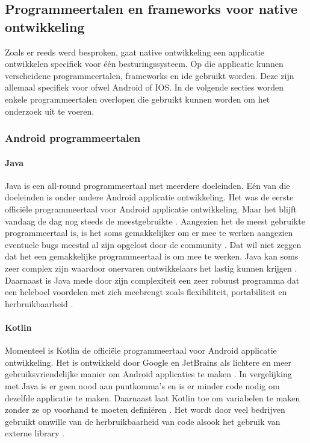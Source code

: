 \subsection{Programmeertalen en frameworks voor native ontwikkeling}
Zoals er reeds werd besproken, gaat native ontwikkeling een applicatie ontwikkelen 
specifiek voor één besturingssysteem. Op die 
applicatie kunnen verscheidene programmeertalen, frameworks 
en \acrshort{ide} gebruikt worden. Deze zijn allemaal specifiek voor ofwel Android of IOS. In de volgende 
secties worden enkele programmeertalen overlopen die gebruikt kunnen worden om het onderzoek uit te voeren.

\subsubsection{Android programmeertalen}
\paragraph{Java}
Java is een all-round programmeertaal met meerdere doeleinden. Eén van die doeleinden 
is onder andere Android applicatie ontwikkeling. Het was de eerste officiële programmeertaal 
voor Android applicatie ontwikkeling. Maar het blijft vandaag de dag nog steeds de 
meestgebruikte \autocite{harkiran2022}. Aangezien het de meest gebruikte programmeertaal 
is, is het soms gemakkelijker om er mee te werken aangezien eventuele bugs meestal al zijn 
opgelost door de community \autocite{Thorndyke2021}. Dat wil niet zeggen dat het een 
gemakkelijke programmeertaal is om mee te werken. Java kan soms zeer complex zijn waardoor 
onervaren ontwikkelaars het lastig kunnen krijgen \autocite{Kesavan2021}. Daarnaast is Java 
mede door zijn complexiteit een zeer robuust programma dat een heleboel voordelen met zich 
meebrengt zoals flexibiliteit, portabiliteit en herbruikbaarheid \autocite{Kesavan2021}.

\paragraph{Kotlin}
Momenteel is Kotlin de officiële programmeertaal voor Android applicatie ontwikkeling. 
Het is ontwikkeld door Google en \Gls{JetBrains} als lichtere en meer gebruiksvriendelijke
manier om Android applicaties te maken \autocite{Thorndyke2021}. In vergelijking met Java 
is er geen nood aan puntkomma's en is er minder code nodig om dezelfde applicatie te maken. Daarnaast laat Kotlin 
toe om variabelen te maken zonder ze op voorhand te moeten definiëren \autocite{Thorndyke2021}. 
Het wordt door veel bedrijven gebruikt omwille van de herbruikbaarheid van code alsook het 
gebruik van externe \gls{library} \autocite{Kesavan2021}.

